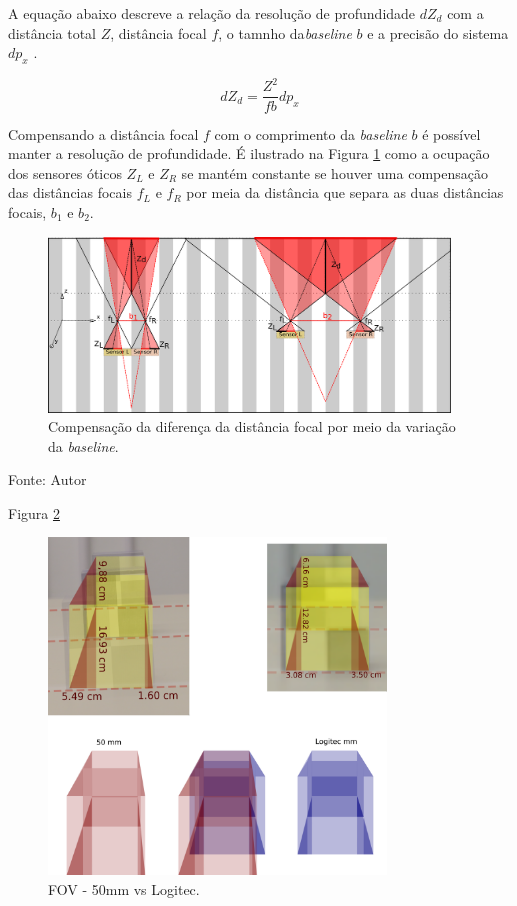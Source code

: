 A equação abaixo descreve a relação da resolução de profundidade $dZ_d$ com a distância total $Z$, distância focal $f$, o tamnho da\textit{baseline} $b$ e a precisão do sistema $dp_x$ \cite{Kyto2011}.

$$ dZ_d = \frac{Z^{2}}{fb}dp_x$$

Compensando a distância focal $f$ com o comprimento da \textit{baseline} $b$ é possível manter a resolução de profundidade.
É ilustrado na Figura \ref{fig:focal_dist_comp_baseline} como a ocupação dos sensores óticos $Z_L$ e $Z_R$ se mantém constante se houver uma compensação das distâncias focais $f_L$ e $f_R$ por meia da distância que separa as duas distâncias focais, $b_1$ e $b_2$.

\begin{figure}[!htb]
  \centering
  \caption{Compensação da diferença da distância focal por meio da variação da \textit{baseline}.}
  \label{fig:focal_dist_comp_baseline}
  \includegraphics[width=0.95\textwidth]{./img/fundamentacao/focal_dist_comp_baseline.png}
\end{figure}

Fonte: Autor

\pagebreak

Figura \ref{fig:aberturas} 

\begin{figure}[!htb]
  \centering
  \caption{FOV - 50mm vs Logitec.}
  \label{fig:aberturas}
  \includegraphics[width=0.80\textwidth]{./img/fundamentacao/aberturas.png}
\end{figure}


